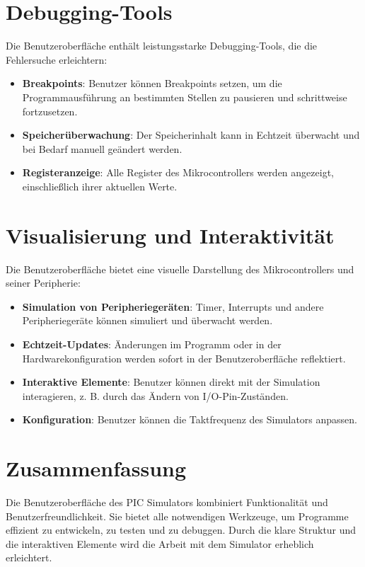 \documentclass[a4paper,11pt]{report}
\begin{document}
\section{Debugging-Tools}
Die Benutzeroberfläche enthält leistungsstarke Debugging-Tools, die die Fehlersuche erleichtern:
\begin{itemize}
    \item \textbf{Breakpoints}: Benutzer können Breakpoints setzen, um die Programmausführung an bestimmten Stellen zu pausieren und schrittweise fortzusetzen.
    \item \textbf{Speicherüberwachung}: Der Speicherinhalt kann in Echtzeit überwacht und bei Bedarf manuell geändert werden.
    \item \textbf{Registeranzeige}: Alle Register des Mikrocontrollers werden angezeigt, einschließlich ihrer aktuellen Werte.
\end{itemize}

\section{Visualisierung und Interaktivität}
Die Benutzeroberfläche bietet eine visuelle Darstellung des Mikrocontrollers und seiner Peripherie:
\begin{itemize}
    \item \textbf{Simulation von Peripheriegeräten}: Timer, Interrupts und andere Peripheriegeräte können simuliert und überwacht werden.
    \item \textbf{Echtzeit-Updates}: Änderungen im Programm oder in der Hardwarekonfiguration werden sofort in der Benutzeroberfläche reflektiert.
    \item \textbf{Interaktive Elemente}: Benutzer können direkt mit der Simulation interagieren, z. B. durch das Ändern von I/O-Pin-Zuständen.
    \item \textbf{Konfiguration}: Benutzer können die Taktfrequenz des Simulators anpassen.
\end{itemize}

\section{Zusammenfassung}
Die Benutzeroberfläche des PIC Simulators kombiniert Funktionalität und Benutzerfreundlichkeit. Sie bietet alle notwendigen Werkzeuge, um Programme effizient zu entwickeln, zu testen und zu debuggen. Durch die klare Struktur und die interaktiven Elemente wird die Arbeit mit dem Simulator erheblich erleichtert.
\end{document}
